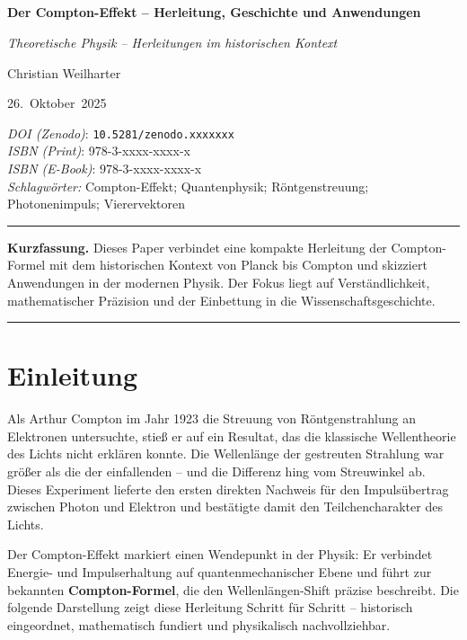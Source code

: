 \documentclass[12pt,oneside]{scrartcl}
\title{\PaperTitle\\[0.5em]\large \SeriesTitle}
\author{\PaperAuthor}
\date{\PaperDate}
\newcommand{\SeriesTitle}{Theoretische Physik – Herleitungen im historischen Kontext}
\newcommand{\PaperTitle}{Der Compton-Effekt – Herleitung, Geschichte und Anwendungen}
\newcommand{\PaperAuthor}{Christian Weilharter}
\newcommand{\PaperDate}{26.\ Oktober\ 2025}
\newcommand{\PaperDOI}{\emph{DOI (Zenodo)}: \texttt{10.5281/zenodo.xxxxxxx}}
\newcommand{\PaperISBNPDF}{\emph{ISBN (Print)}: 978-3-xxxx-xxxx-x}
\newcommand{\PaperISBNEPUB}{\emph{ISBN (E-Book)}: 978-3-xxxx-xxxx-x}
\newcommand{\PaperKeywords}{Compton-Effekt; Quantenphysik; Röntgenstreuung; Photonenimpuls; Vierervektoren}
\newcommand{\PaperMetadata}{
	\vspace{1em}
	\begin{flushleft}
		\small
		\setlength{\parskip}{3pt}
		\noindent\PaperDOI\\
		\PaperISBNPDF\\
		\PaperISBNEPUB\\
		\textit{Schlagwörter:} \PaperKeywords
	\end{flushleft}
	\vspace{1em}
}
\begin{document}
	
	\thispagestyle{empty}
	\begin{center}
		{\Huge\bfseries \PaperTitle\par}
		\vspace{0.5em}
		{\Large\itshape \SeriesTitle\par}
		\vspace{2em}
		{\Large \PaperAuthor\par}
		\vspace{0.5em}
		{\large \PaperDate\par}
	\end{center}
	
	\PaperMetadata
	
	\vspace{1em}
	\hrule
	\vspace{1em}
	
	\noindent\textbf{Kurzfassung.}  
	Dieses Paper verbindet eine kompakte Herleitung der Compton-Formel mit dem historischen Kontext von Planck bis Compton und skizziert Anwendungen in der modernen Physik. Der Fokus liegt auf Verständlichkeit, mathematischer Präzision und der Einbettung in die Wissenschaftsgeschichte.
	
	\vspace{1em}
	\hrule
	\vspace{2em}
	
	
	\section{Einleitung}
	
	Als Arthur Compton im Jahr 1923 die Streuung von Röntgenstrahlung an Elektronen untersuchte, stieß er auf ein Resultat, das die klassische Wellentheorie des Lichts nicht erklären konnte. Die Wellenlänge der gestreuten Strahlung war größer als die der einfallenden – und die Differenz hing vom Streuwinkel ab. Dieses Experiment lieferte den ersten direkten Nachweis für den Impulsübertrag zwischen Photon und Elektron und bestätigte damit den Teilchencharakter des Lichts.
	
	Der Compton-Effekt markiert einen Wendepunkt in der Physik: Er verbindet Energie- und Impulserhaltung auf quantenmechanischer Ebene und führt zur bekannten \textbf{Compton-Formel}, die den Wellenlängen-Shift präzise beschreibt. Die folgende Darstellung zeigt diese Herleitung Schritt für Schritt – historisch eingeordnet, mathematisch fundiert und physikalisch nachvollziehbar.
	
\end{document}
